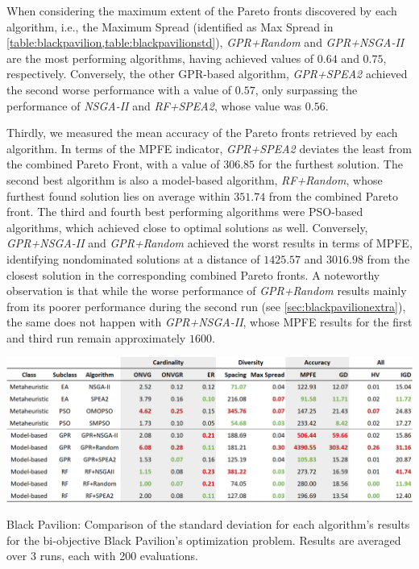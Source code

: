 When considering the maximum extent of the Pareto fronts discovered by each algorithm, i.e., the Maximum Spread (identified as Max Spread in \cref{table:blackpavilion,table:blackpavilionstd}), \textit{GPR+Random} and \textit{GPR+NSGA-II} are the most performing algorithms, having achieved values of $0.64$ and $0.75$, respectively. Conversely, the other GPR-based algorithm, \textit{GPR+SPEA2} achieved the second worse performance with a value of $0.57$, only surpassing the performance of \textit{NSGA-II} and \textit{RF+SPEA2}, whose value was $0.56$. 

Thirdly, we measured the mean accuracy of the Pareto fronts retrieved by each algorithm. In terms of the \ac{MPFE} indicator, \textit{GPR+SPEA2} deviates the least from the combined Pareto Front, with a value of $306.85$ for the furthest solution. The second best algorithm is also a model-based algorithm, \textit{RF+Random}, whose furthest found solution lies on average within $351.74$ from the combined Pareto front.  The third and fourth best performing algorithms were \ac{PSO}-based algorithms, which achieved close to optimal solutions as well. Conversely, \textit{GPR+NSGA-II} and \textit{GPR+Random} achieved the worst results in terms of \ac{MPFE}, identifying nondominated solutions at a distance of $1425.57$ and $3016.98$ from the closest solution in the corresponding combined Pareto fronts. A noteworthy observation is that while the worse performance of \textit{GPR+Random} results mainly from its poorer performance during the second run (see \cref{sec:blackpavilionextra}), the same does not happen with \textit{GPR+NSGA-II}, whose \ac{MPFE} results for the first and third run remain approximately $1600$. 

\begin{table}[htbp]
	\centering
	\includegraphics[width=\textwidth]{Images/Evaluation/BlackPavilion/Results_Std_20190416.PNG}
	\caption[Black Pavilion: Standard deviation values of the algorithms' results]{Black Pavilion: Comparison of the standard deviation for each algorithm's results for the bi-objective Black Pavilion's optimization problem. Results are averaged over 3 runs, each with 200 evaluations.}
	\label{table:blackpavilionstd}
\end{table}

